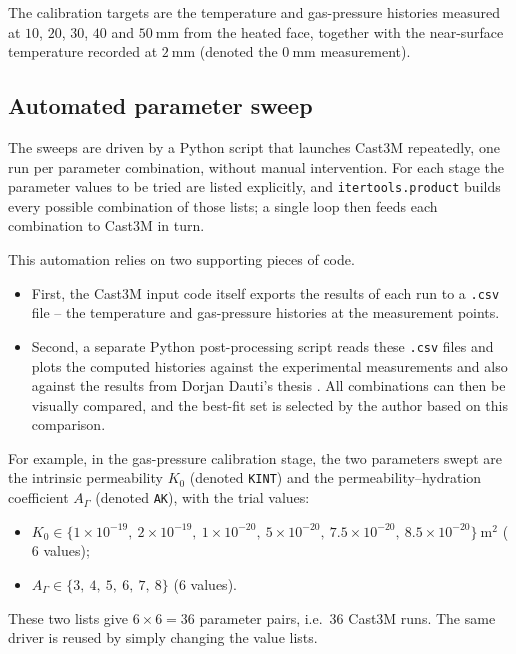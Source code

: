 The calibration targets are the temperature and gas-pressure histories measured at $10$, $20$, $30$, $40$ and $50~\mathrm{mm}$ from the heated face, together with the near-surface temperature recorded at $2~\mathrm{mm}$ (denoted the $0~\mathrm{mm}$ measurement).

\subsection{Automated parameter sweep} \label{sec:cal-automation}
The sweeps are driven by a Python script that launches Cast3M repeatedly, one run per parameter combination, without manual intervention. For each stage the parameter values to be tried are listed explicitly, and \texttt{itertools.product} builds every possible combination of those lists; a single loop then feeds each combination to Cast3M in turn.

This automation relies on two supporting pieces of code. 
\begin{itemize}
 \item First, the Cast3M input code itself exports the results of each run to a \texttt{.csv} file -- the temperature and gas-pressure histories at the measurement points.
 \item Second, a separate Python post-processing script reads these \texttt{.csv} files and plots the computed histories against the experimental measurements \cite{kalifa2000} and also against the results from Dorjan Dauti's thesis \cite{dauti2018}. All combinations can then be visually compared, and the best-fit set is selected by the author based on this comparison.
\end{itemize}
 
For example, in the gas-pressure calibration stage, the two parameters swept are the intrinsic permeability $K_0$ (denoted \texttt{KINT}) and the permeability--hydration coefficient $A_\Gamma$ (denoted \texttt{AK}), with the trial values:
\begin{itemize}
  \item $K_0 \in \{1\!\times\!10^{-19},\ 2\!\times\!10^{-19},\ 1\!\times\!10^{-20},\
  5\!\times\!10^{-20},\ 7.5\!\times\!10^{-20},\ 8.5\!\times\!10^{-20}\}~\mathrm{m^2}$
  ($6$ values);
  \item $A_\Gamma \in \{3,\ 4,\ 5,\ 6,\ 7,\ 8\}$ ($6$ values).
\end{itemize}
These two lists give $6\times 6 = 36$ parameter pairs, i.e.\ $36$ Cast3M runs. The same driver is reused by simply changing the value lists.

